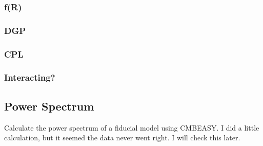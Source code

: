 \subsubsection{f(R)}
\subsubsection{DGP}
\subsubsection{CPL}
\subsubsection{Interacting?}




\subsection{Power Spectrum}

Calculate the power spectrum of a fiducial model using CMBEASY. {\color{red}I did a little calculation, but it seemed the data never went right. I will check this later.}




